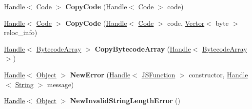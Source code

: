 \begin{DoxyCompactItemize}
\item 
\hyperlink{classv8_1_1internal_1_1_handle}{Handle}$<$ \hyperlink{classv8_1_1internal_1_1_code}{Code} $>$ {\bfseries Copy\+Code} (\hyperlink{classv8_1_1internal_1_1_handle}{Handle}$<$ \hyperlink{classv8_1_1internal_1_1_code}{Code} $>$ code)\hypertarget{classv8_1_1internal_1_1_factory_a6389202fd62ae8aaea4c141c3f861757}{}\label{classv8_1_1internal_1_1_factory_a6389202fd62ae8aaea4c141c3f861757}

\item 
\hyperlink{classv8_1_1internal_1_1_handle}{Handle}$<$ \hyperlink{classv8_1_1internal_1_1_code}{Code} $>$ {\bfseries Copy\+Code} (\hyperlink{classv8_1_1internal_1_1_handle}{Handle}$<$ \hyperlink{classv8_1_1internal_1_1_code}{Code} $>$ code, \hyperlink{classv8_1_1internal_1_1_vector}{Vector}$<$ byte $>$ reloc\+\_\+info)\hypertarget{classv8_1_1internal_1_1_factory_acaf03f39fde1588f1d90e7d779637428}{}\label{classv8_1_1internal_1_1_factory_acaf03f39fde1588f1d90e7d779637428}

\item 
\hyperlink{classv8_1_1internal_1_1_handle}{Handle}$<$ \hyperlink{classv8_1_1internal_1_1_bytecode_array}{Bytecode\+Array} $>$ {\bfseries Copy\+Bytecode\+Array} (\hyperlink{classv8_1_1internal_1_1_handle}{Handle}$<$ \hyperlink{classv8_1_1internal_1_1_bytecode_array}{Bytecode\+Array} $>$)\hypertarget{classv8_1_1internal_1_1_factory_a7d8dfa78aa9be6b35c8cb7fa25950589}{}\label{classv8_1_1internal_1_1_factory_a7d8dfa78aa9be6b35c8cb7fa25950589}

\item 
\hyperlink{classv8_1_1internal_1_1_handle}{Handle}$<$ \hyperlink{classv8_1_1internal_1_1_object}{Object} $>$ {\bfseries New\+Error} (\hyperlink{classv8_1_1internal_1_1_handle}{Handle}$<$ \hyperlink{classv8_1_1internal_1_1_j_s_function}{J\+S\+Function} $>$ constructor, \hyperlink{classv8_1_1internal_1_1_handle}{Handle}$<$ \hyperlink{classv8_1_1internal_1_1_string}{String} $>$ message)\hypertarget{classv8_1_1internal_1_1_factory_ae8fda78659873f936ee1d82d8cea9570}{}\label{classv8_1_1internal_1_1_factory_ae8fda78659873f936ee1d82d8cea9570}

\item 
\hyperlink{classv8_1_1internal_1_1_handle}{Handle}$<$ \hyperlink{classv8_1_1internal_1_1_object}{Object} $>$ {\bfseries New\+Invalid\+String\+Length\+Error} ()\hypertarget{classv8_1_1internal_1_1_factory_a4dc0f6f502632904566bc1d72c7e04e4}{}\label{classv8_1_1internal_1_1_factory_a4dc0f6f502632904566bc1d72c7e04e4}


\end{DoxyCompactItemize}
